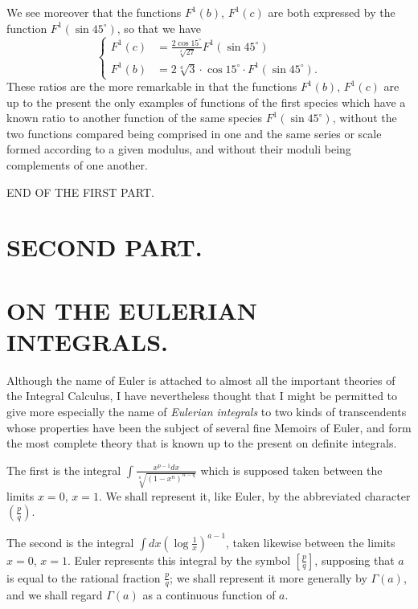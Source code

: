 \documentclass{article}
\begin{document}
We see moreover that the functions $F^{1}(b)$, $F^{1}(c)$ are both expressed by the function $F^{1}(\sin 45^{\circ})$, so that we have
\[ \left\{\begin{aligned} F^{1}(c)&=\frac{2\cos 15^{\circ}}{\sqrt[4]{27}}F^{1}(\sin 45^{\circ})\\ F^{1}(b)&=2\sqrt[4]{3}\cdot\cos 15^{\circ}\cdot F^{1}(\sin 45^{\circ}). \end{aligned}\right. \]
These ratios are the more remarkable in that the functions $F^{1}(b)$, $F^{1}(c)$ are up to the present the only examples of functions of the first species which have a known ratio to another function of the same species $F^{1}(\sin 45^{\circ})$, without the two functions compared being comprised in one and the same series or scale formed according to a given modulus, and without their moduli being complements of one another.

END OF THE FIRST PART.


\section*{SECOND PART.}

\section*{ON THE EULERIAN INTEGRALS.}

Although the name of Euler is attached to almost all the important theories of the Integral Calculus, I have nevertheless thought that I might be permitted to give more especially the name of \emph{Eulerian integrals} to two kinds of transcendents whose properties have been the subject of several fine Memoirs of Euler, and form the most complete theory that is known up to the present on definite integrals.

The first is the integral $\displaystyle\int\frac{x^{p-1}dx}{\sqrt[n]{(1-x^{n})^{n-q}}}$ which is supposed taken between the limits $x=0$, $x=1$. We shall represent it, like Euler, by the abbreviated character $\left(\frac{p}{q}\right)$.

The second is the integral $\displaystyle\int dx\left(\log\frac{1}{x}\right)^{a-1}$, taken likewise between the limits $x=0$, $x=1$. Euler represents this integral by the symbol $\left[\frac{p}{q}\right]$, supposing that $a$ is equal to the rational fraction $\frac{p}{q}$; we shall represent it more generally by $\Gamma(a)$, and we shall regard $\Gamma(a)$ as a continuous function of $a$.
\end{document}
